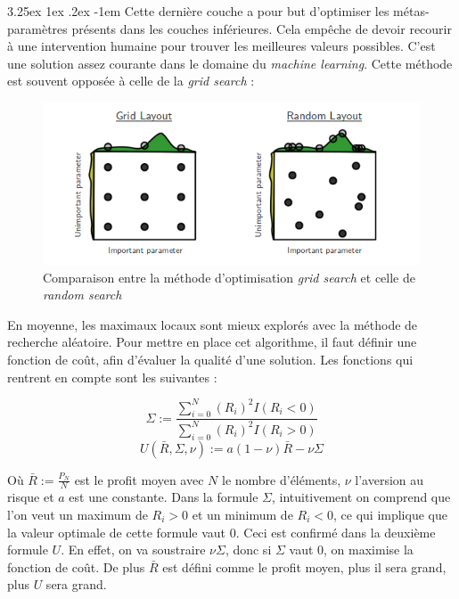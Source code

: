 \documentclass[a4paper, 11pt]{article}
\makeatletter
\renewcommand\paragraph{\@startsection{paragraph}{5}{\z@}%
  {3.25ex \@plus1ex \@minus.2ex}%
  {-1em}%
  {\normalfont\normalsize\bfseries}}
\makeatother
\begin{document}
\paragraph{}
Cette dernière couche a pour but d'optimiser les métas-paramètres présents dans les couches inférieures. Cela empêche de devoir recourir à une intervention
humaine pour trouver les meilleures valeurs possibles. C'est une solution assez courante dans le domaine du \textit{machine learning}\cite{automated_hyperparamters}. Cette méthode est
souvent opposée à celle de la \textit{grid search} \cite{grid_vs_random}:
\begin{figure}[H]
\centering
\includegraphics[scale=0.75]{images/grid_vs_random}
\caption{Comparaison entre la méthode d'optimisation \textit{grid search} et celle de \textit{random search}}
\end{figure}

En moyenne, les maximaux locaux sont mieux explorés avec la méthode de recherche aléatoire. Pour mettre en place cet algorithme, il faut définir une
fonction de coût, afin d'évaluer la qualité d'une solution.
Les fonctions qui rentrent en compte sont les suivantes :
\begin{center}
 $$ \Sigma := \frac{\sum_{i=0}^N (R_i)^2 I (R_i < 0)}{\sum_{i=0}^N (R_i)^2 I (R_i > 0)}$$
 $$ U(\bar{R}, \Sigma, \nu) := a (1 - \nu) \bar{R} - \nu \Sigma$$
\end{center}

Où $\bar{R} := \frac{P_N}{N}$ est le profit moyen avec $N$ le nombre d'éléments, $\nu$ l'aversion au risque et $a$ est une constante.
Dans la formule $\Sigma$, intuitivement on comprend que l'on veut un maximum de $R_i > 0$ et un minimum de $R_i < 0$, ce qui implique que la valeur
optimale de cette formule vaut $0$. Ceci est confirmé dans la deuxième formule $U$. En effet, on va soustraire $\nu \Sigma$, donc si $\Sigma$ vaut $0$,
on maximise la fonction de coût. De plus $\bar{R}$ est défini comme le profit moyen, plus il sera grand, plus $U$ sera grand.
\end{document}
